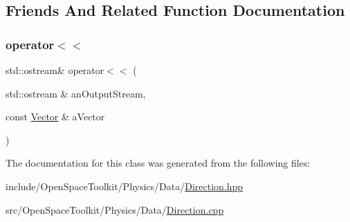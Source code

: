 \subsection{Friends And Related Function Documentation}
\mbox{\label{classostk_1_1physics_1_1data_1_1_direction_a2f1253dbad20965d2209456421eabf71}} 
\subsubsection{\texorpdfstring{operator$<$$<$}{operator<<}}
{\footnotesize\ttfamily std\+::ostream\& operator$<$$<$ (\begin{DoxyParamCaption}\item[{std\+::ostream \&}]{an\+Output\+Stream,  }\item[{const \hyperlink{classostk_1_1physics_1_1data_1_1_vector}{Vector} \&}]{a\+Vector }\end{DoxyParamCaption})\hspace{0.3cm}{\ttfamily [friend]}}



The documentation for this class was generated from the following files\+:\begin{DoxyCompactItemize}
\item 
include/\+Open\+Space\+Toolkit/\+Physics/\+Data/\hyperlink{_direction_8hpp}{Direction.\+hpp}\item 
src/\+Open\+Space\+Toolkit/\+Physics/\+Data/\hyperlink{_direction_8cpp}{Direction.\+cpp}\end{DoxyCompactItemize}
